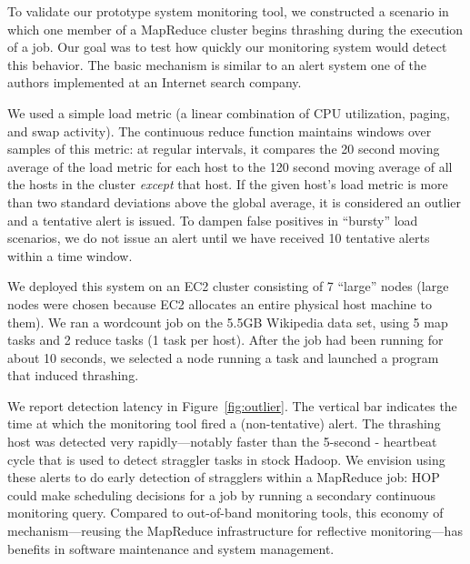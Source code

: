 To validate our prototype system monitoring tool, we constructed a
scenario in which one member of a MapReduce cluster begins thrashing
during the execution of a job. Our goal was to test how quickly our
monitoring system would detect this behavior. The basic mechanism is
similar to an alert system one of the authors implemented at an
Internet search company.

We used a simple load metric (a linear combination of CPU utilization,
paging, and swap activity). The continuous reduce function maintains
windows over samples of this metric: at regular intervals, it
compares the 20 second moving average of the load metric for each host
to the 120 second moving average of all the hosts in the cluster
\emph{except} that host.  If the given host's load metric is more
than two standard deviations above the global average, it is
considered an outlier and a tentative alert is issued.  To dampen
false positives in ``bursty'' load scenarios, we do not issue an alert
until we have received 10 tentative alerts within a time window.

We deployed this system on an EC2 cluster consisting of 7 ``large''
nodes (large nodes were chosen because EC2 allocates an entire
physical host machine to them). We ran a wordcount job on the 5.5GB Wikipedia
data set, using 5 map tasks and 2 reduce tasks (1 task per host). After
the job had been running for about 10 seconds, we selected a node
running a task and launched a program that induced thrashing.

We report detection latency in Figure~\ref{fig:outlier}. The vertical bar
indicates the time at which the monitoring tool fired a (non-tentative)
alert. The thrashing host was detected very rapidly---notably faster than the
5-second {\TT}-{\JT} heartbeat cycle that is used to detect straggler tasks in
stock Hadoop. We envision using these alerts to do early detection of stragglers
within a MapReduce job: HOP could make scheduling decisions for a job by running
a secondary continuous monitoring query. Compared to out-of-band monitoring
tools, this economy of mechanism---reusing the MapReduce infrastructure for
reflective monitoring---has benefits in software maintenance and system
management.
